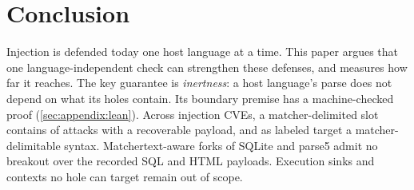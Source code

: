 \section{Conclusion}
\label{sec:concl}

Injection is defended today one host language at a time.
This paper argues that one
language-independent check can strengthen these defenses,
and measures how far it reaches.
The key guarantee is \emph{inertness}:
a host language's parse does not depend on what
its holes contain. Its boundary premise has a machine-checked proof
(\cref{sec:appendix:lean}). Across \dataInjectionCVEs injection CVEs, a
matcher-delimited slot contains \dataContainedShare of attacks with a recoverable
payload, and \dataHostableShare as labeled target a matcher-delimitable syntax.
Matchertext-aware forks of SQLite and parse5 admit no breakout over the recorded
SQL and HTML payloads. Execution sinks and contexts no hole can target remain
out of scope.
